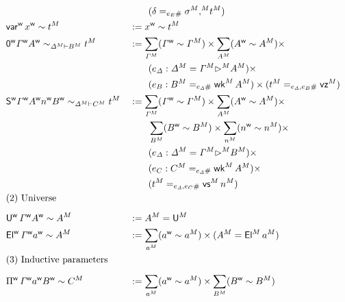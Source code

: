 \begin{alignat*}{5}
    \\
    & && \qquad
    (\delta = _{e_E \#} \model\sigma \model{\cons} \model{t} )
    \\
  & \varw\,\wf{x} \sim \model{t}
   && := \wf{x}\sim \model{t} \\
   & \relV{\vzw\wf{\GG}\wf{A}}{\model{\GD}}{\model{B}}{\model{t}}
   && :=
    \sum_{\model{\GG}} (\wf{\GG}\sim\model{\GG}) \times
    \sum_{\model{A}} (\wf{A}\sim\model{A}) \times \\
    & &&
    \qquad
  (e_\GD : \model{\GD} = \model{\GG} \model{\ext} \model{A})
     \times
    \\
    & && \qquad
     (e_B : \model{B} = _{e_\GD \#} \model{\wk}\,\model{A}) \times
     (\model{t} = _{e_\GD,e_B \#} \model{\vz})
  \\
  &
   \relV{\vsw \wf{\GG} \wf{A} \wf{n} \wf{B}}{\model\GD}{\model{C}}{\model{t}}
   && :=
    \sum_{\model{\GG}} (\wf{\GG}\sim\model{\GG}) \times
    \sum_{\model{A}} (\wf{A}\sim\model{A}) \times
    \\
    & &&\qquad
    \sum_{\model{B}} (\wf{B}\sim\model{B}) \times
    \sum_{\model{n}} (\wf{n}\sim\model{n}) \times
    \\
    & &&
    \qquad
  (e_\GD : \model{\GD} = \model{\GG} \model{\ext} \model{B})
     \times
    \\
    & && \qquad
     (e_C : \model{C} = _{e_\GD \#} \model{\wk}\,\model{A}) \times
     \\
     & && \qquad
     (\model{t} = _{e_\GD,e_C \#} \model{\vs} \, \model{n})
  \\
  & \rlap{(2) Universe} \\[0.5em]
  & \Uw\, \wf{\GG} \wf{A} \sim \model{A} &&
   := \model{A} = \model{\U}
  \\
  & \Elw\, \wf{\GG} \wf{a} \sim \model{A}
  && :=
  \sum_{\model{a}} (\wf{a}\sim  \model{a}) \times
    (\model{A} = \model{\El}\,\model{a})
  \\
  & \rlap{(3) Inductive parameters} \\[0.5em]
  & \Piw\,\wf{\GG} \wf{a} \wf{B} \sim \model{C} &&
   :=
      \sum_{\model{a}} (\wf{a}\sim\model{a})
      \times
      \sum_{\model{B}} (\wf{B}\sim\model{B})
      \\

\end{alignat*}
